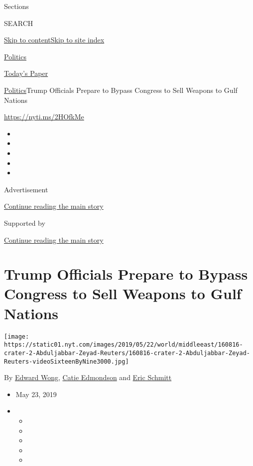 Sections

SEARCH

\protect\hyperlink{site-content}{Skip to
content}\protect\hyperlink{site-index}{Skip to site index}

\href{https://www.nytimes.com/section/politics}{Politics}

\href{https://myaccount.nytimes.com/auth/login?response_type=cookie\&client_id=vi}{}

\href{https://www.nytimes.com/section/todayspaper}{Today's Paper}

\href{/section/politics}{Politics}\textbar{}Trump Officials Prepare to
Bypass Congress to Sell Weapons to Gulf Nations

\url{https://nyti.ms/2HOfkMe}

\begin{itemize}
\item
\item
\item
\item
\item
\end{itemize}

Advertisement

\protect\hyperlink{after-top}{Continue reading the main story}

Supported by

\protect\hyperlink{after-sponsor}{Continue reading the main story}

\hypertarget{trump-officials-prepare-to-bypass-congress-to-sell-weapons-to-gulf-nations}{%
\section{Trump Officials Prepare to Bypass Congress to Sell Weapons to
Gulf
Nations}\label{trump-officials-prepare-to-bypass-congress-to-sell-weapons-to-gulf-nations}}

\texttt{[image: https://static01.nyt.com/images/2019/05/22/world/middleeast/160816-crater-2-Abduljabbar-Zeyad-Reuters/160816-crater-2-Abduljabbar-Zeyad-Reuters-videoSixteenByNine3000.jpg]}

By \href{https://www.nytimes.com/by/edward-wong}{Edward Wong},
\href{https://www.nytimes.com/by/catie-edmondson}{Catie Edmondson} and
\href{https://www.nytimes.com/by/eric-schmitt}{Eric Schmitt}

\begin{itemize}
\item
  May 23, 2019
\item
  \begin{itemize}
  \item
  \item
  \item
  \item
  \item
  \end{itemize}
\end{itemize}

